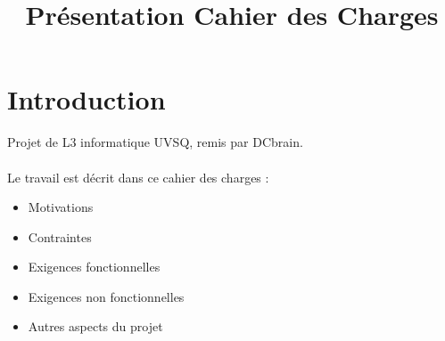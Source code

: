 
\usepackage{../tex/myInfolines}
\usepackage{longtable,array}
\title{Présentation Cahier des Charges}



	\begin{frame}
		\titlepage
	\end{frame}
	
	\section{Introduction}
	\begin{frame}
		Projet de L3 informatique UVSQ, remis par DCbrain.\\~\\
		Le travail est décrit dans ce cahier des charges :
		\begin{itemize}
			\item Motivations
			\item Contraintes
			\item Exigences fonctionnelles
			\item Exigences non fonctionnelles
			\item Autres aspects du projet
		\end{itemize}
	\end{frame}
	
